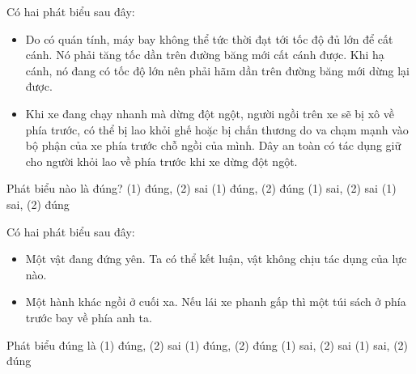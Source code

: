 \begin{ex}%
Có hai phát biểu sau đây:
\begin{itemize}
\item[(1)] Do có quán tính, máy bay không thể tức thời đạt tới tốc độ đủ lớn để cất cánh. Nó phải tăng tốc dần trên đường băng mới cất cánh được. Khi hạ cánh, nó đang có tốc độ lớn nên phải hãm dần trên đường băng mới dừng lại được.
\item[(2)] Khi xe đang chạy nhanh mà dừng đột ngột, người ngồi trên xe sẽ bị xô về phía trước, có thể bị lao khỏi ghế hoặc bị chấn thương do va chạm mạnh vào bộ phận của xe phía trước chỗ ngồi của mình. Dây an toàn có tác dụng giữ cho người khỏi lao về phía trước khi xe dừng đột ngột.
\end{itemize}
Phát biểu nào là đúng?
\choice
{(1) đúng, (2) sai}
{\True (1) đúng, (2) đúng}
{(1) sai, (2) sai}
{(1) sai, (2) đúng}
  \end{ex}
\begin{ex}%
Có hai phát biểu sau đây:
\begin{itemize}
\item[(1)] Một vật đang đứng yên. Ta có thể kết luận, vật không chịu tác dụng của lực nào.
\item[(2)] Một hành khác ngồi ở cuối xa. Nếu lái xe phanh gấp thì một túi sách ở phía trước bay về phía anh ta. 
\end{itemize}
Phát biểu đúng là
\choice
{(1) đúng, (2) sai}
{(1) đúng, (2) đúng}
{\True (1) sai, (2) sai}
{(1) sai, (2) đúng}
  \end{ex}















